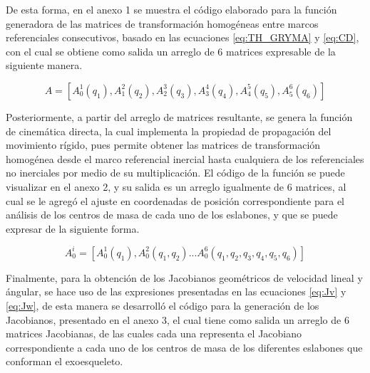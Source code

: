     De esta forma, en el anexo 1 se muestra el código elaborado para la función generadora de 
    las matrices de transformación homogéneas entre marcos referenciales consecutivos, basado 
    en las ecuaciones \ref{eq:TH_GRYMA} y \ref{eq:CD}, con el cual se obtiene como salida un arreglo de 6 matrices 
    expresable de la siguiente manera.

    \begin{equation*}
        A = [A^1_0(q_1), A^2_1(q_2), A^3_2(q_3), A^4_3(q_4), A^5_4(q_5), A^6_5(q_6)]
    \end{equation*}

    Posteriormente, a partir del arreglo de matrices resultante, se genera la función 
    de cinemática directa, la cual implementa la propiedad de propagación del movimiento 
    rígido, pues permite obtener las matrices de transformación homogénea desde el marco 
    referencial inercial hasta cualquiera de los referenciales no inerciales por medio de su multiplicación. 
    El código de la función se puede visualizar en el anexo 2, y su salida es un arreglo igualmente de 
    6 matrices, al cual se le agregó el ajuste en coordenadas de posición correspondiente para 
    el análisis de los centros de masa de cada uno de los eslabones, y que se puede expresar 
    de la siguiente forma.

    \begin{equation*}
        A^i_0 = [A^1_0(q_1), A^2_0(q_1,q_2)...A^6_0(q_1,q_2,q_3,q_4,q_5,q_6)]
    \end{equation*}

    Finalmente, para la obtención de los Jacobianos geométricos de velocidad lineal y ángular, 
    se hace uso de las expresiones presentadas en las ecuaciones \ref{eq:Jv} y \ref{eq:Jw}, de 
    esta manera se desarrolló el código para la generación de los Jacobianos, presentado en el 
    anexo 3, el cual tiene como salida un arreglo de 6 matrices Jacobianas, de las cuales cada una 
    representa el Jacobiano correspondiente a cada uno de los centros de masa de los diferentes eslabones 
    que conforman el exoesqueleto.


